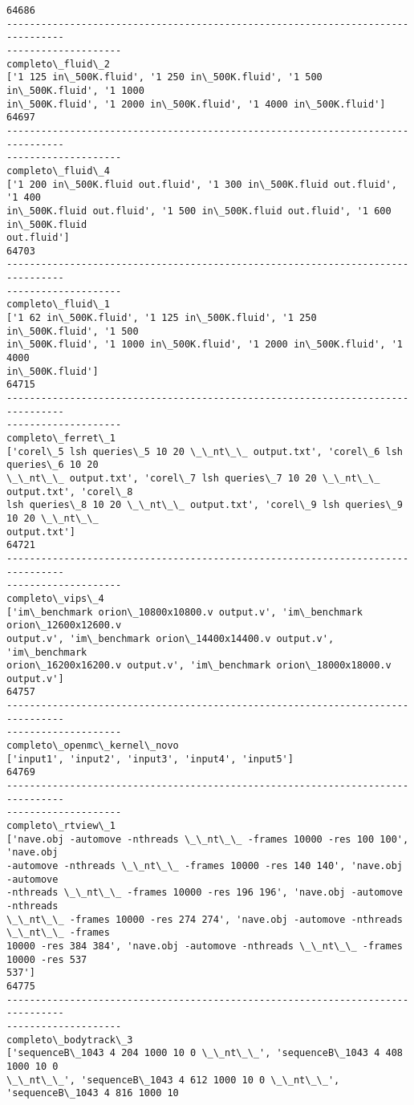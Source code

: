 \documentclass[11pt]{article}
\begin{document}
\begin{Verbatim}[commandchars=\\\{\}]
64686
--------------------------------------------------------------------------------
--------------------
completo\_fluid\_2
['1 125 in\_500K.fluid', '1 250 in\_500K.fluid', '1 500 in\_500K.fluid', '1 1000
in\_500K.fluid', '1 2000 in\_500K.fluid', '1 4000 in\_500K.fluid']
64697
--------------------------------------------------------------------------------
--------------------
completo\_fluid\_4
['1 200 in\_500K.fluid out.fluid', '1 300 in\_500K.fluid out.fluid', '1 400
in\_500K.fluid out.fluid', '1 500 in\_500K.fluid out.fluid', '1 600 in\_500K.fluid
out.fluid']
64703
--------------------------------------------------------------------------------
--------------------
completo\_fluid\_1
['1 62 in\_500K.fluid', '1 125 in\_500K.fluid', '1 250 in\_500K.fluid', '1 500
in\_500K.fluid', '1 1000 in\_500K.fluid', '1 2000 in\_500K.fluid', '1 4000
in\_500K.fluid']
64715
--------------------------------------------------------------------------------
--------------------
completo\_ferret\_1
['corel\_5 lsh queries\_5 10 20 \_\_nt\_\_ output.txt', 'corel\_6 lsh queries\_6 10 20
\_\_nt\_\_ output.txt', 'corel\_7 lsh queries\_7 10 20 \_\_nt\_\_ output.txt', 'corel\_8
lsh queries\_8 10 20 \_\_nt\_\_ output.txt', 'corel\_9 lsh queries\_9 10 20 \_\_nt\_\_
output.txt']
64721
--------------------------------------------------------------------------------
--------------------
completo\_vips\_4
['im\_benchmark orion\_10800x10800.v output.v', 'im\_benchmark orion\_12600x12600.v
output.v', 'im\_benchmark orion\_14400x14400.v output.v', 'im\_benchmark
orion\_16200x16200.v output.v', 'im\_benchmark orion\_18000x18000.v output.v']
64757
--------------------------------------------------------------------------------
--------------------
completo\_openmc\_kernel\_novo
['input1', 'input2', 'input3', 'input4', 'input5']
64769
--------------------------------------------------------------------------------
--------------------
completo\_rtview\_1
['nave.obj -automove -nthreads \_\_nt\_\_ -frames 10000 -res 100 100', 'nave.obj
-automove -nthreads \_\_nt\_\_ -frames 10000 -res 140 140', 'nave.obj -automove
-nthreads \_\_nt\_\_ -frames 10000 -res 196 196', 'nave.obj -automove -nthreads
\_\_nt\_\_ -frames 10000 -res 274 274', 'nave.obj -automove -nthreads \_\_nt\_\_ -frames
10000 -res 384 384', 'nave.obj -automove -nthreads \_\_nt\_\_ -frames 10000 -res 537
537']
64775
--------------------------------------------------------------------------------
--------------------
completo\_bodytrack\_3
['sequenceB\_1043 4 204 1000 10 0 \_\_nt\_\_', 'sequenceB\_1043 4 408 1000 10 0
\_\_nt\_\_', 'sequenceB\_1043 4 612 1000 10 0 \_\_nt\_\_', 'sequenceB\_1043 4 816 1000 10

\end{Verbatim}
\end{document}
